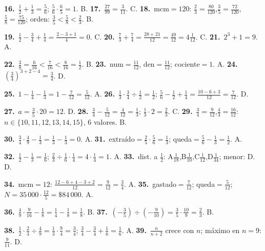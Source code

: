 \documentclass[11pt, letterpaper]{article}
\begin{document}
\textbf{16.}~$\tfrac{1}{2}+\tfrac{1}{3}=\tfrac{5}{6}$; $\tfrac{5}{6}\cdot\tfrac{6}{5}=1$. B. \quad
\textbf{17.}~$\tfrac{27}{99}=\tfrac{3}{11}$. C. \quad
\textbf{18.}~mcm$=120$: $\tfrac{2}{3}=\tfrac{80}{120}$,$\tfrac{3}{5}=\tfrac{72}{120}$,$\tfrac{5}{8}=\tfrac{75}{120}$; orden: $\tfrac{3}{5}<\tfrac{5}{8}<\tfrac{2}{3}$. B.

\textbf{19.}~$\tfrac{1}{2}-\tfrac{3}{4}+\tfrac{1}{4}=\tfrac{2-3+1}{4}=0$. C. \quad
\textbf{20.}~$\tfrac{7}{3}+\tfrac{7}{4}=\tfrac{28+21}{12}=\tfrac{49}{12}=4\tfrac{1}{12}$. C. \quad
\textbf{21.}~$2^3+1=9$. A.

\textbf{22.}~$\tfrac{3}{8}=\tfrac{6}{16}<\tfrac{7}{16}<\tfrac{8}{16}=\tfrac{1}{2}$. B. \quad
\textbf{23.}~num$=\tfrac{11}{12}$, den$=\tfrac{11}{12}$; cociente$=1$. A. \quad
\textbf{24.}~$\left(\tfrac{3}{4}\right)^{3+2-4}=\tfrac{3}{4}$. D.

\textbf{25.}~$1-\tfrac{1}{4}-\tfrac{1}{3}=1-\tfrac{7}{12}=\tfrac{5}{12}$. A. \quad
\textbf{26.}~$\tfrac{1}{3}\cdot\tfrac{3}{4}\div\tfrac{1}{2}=\tfrac{1}{2}$; $\tfrac{5}{6}-\tfrac{1}{2}+\tfrac{1}{4}=\tfrac{10-6+3}{12}=\tfrac{7}{12}$. D.

\textbf{27.}~$a=\tfrac{3}{5}\cdot20=12$. D. \quad
\textbf{28.}~$\tfrac{3}{4}-\tfrac{5}{12}=\tfrac{4}{12}=\tfrac{1}{3}$; $\tfrac{1}{3}\cdot2=\tfrac{2}{3}$. C. \quad
\textbf{29.}~$\tfrac{3}{4}=\tfrac{9}{12}$,$\tfrac{4}{3}=\tfrac{16}{12}$: $n\in\{10,11,12,13,14,15\}$, 6 valores. B.

\textbf{30.}~$\tfrac{3}{4}\cdot\tfrac{4}{9}-\tfrac{1}{3}=\tfrac{1}{3}-\tfrac{1}{3}=0$. A. \quad
\textbf{31.}~extra\'ido$=\tfrac{2}{5}\cdot\tfrac{5}{6}=\tfrac{1}{3}$; queda$=\tfrac{5}{6}-\tfrac{1}{3}=\tfrac{1}{2}$. A.

\textbf{32.}~$\tfrac{1}{2}-\tfrac{1}{3}=\tfrac{1}{6}$; $\tfrac{2}{3}\div\tfrac{1}{6}\cdot\tfrac{1}{4}=4\cdot\tfrac{1}{4}=1$. A. \quad
\textbf{33.}~dist. a $\tfrac{1}{2}$: A$\tfrac{1}{18}$,B$\tfrac{1}{10}$,C$\tfrac{1}{12}$,D$\tfrac{1}{34}$; menor: D. D.

\textbf{34.}~mcm$=12$: $\tfrac{12-6+4-3+2}{12}=\tfrac{9}{12}=\tfrac{3}{4}$. A. \quad
\textbf{35.}~gastado$=\tfrac{7}{12}$; queda$=\tfrac{5}{12}$; $N=35\,000\cdot\tfrac{12}{5}=\$84\,000$. A.

\textbf{36.}~$\tfrac{4}{9}\cdot\tfrac{9}{16}-\tfrac{1}{8}=\tfrac{1}{4}-\tfrac{1}{8}=\tfrac{1}{8}$. B. \quad
\textbf{37.}~$(-\tfrac{3}{5})\div(-\tfrac{9}{10})=\tfrac{3}{5}\cdot\tfrac{10}{9}=\tfrac{2}{3}$. B.

\textbf{38.}~$\tfrac{1}{2}\cdot\tfrac{2}{3}\div\tfrac{4}{9}=\tfrac{1}{3}\cdot\tfrac{9}{4}=\tfrac{3}{4}$; $\tfrac{3}{4}-\tfrac{3}{4}+\tfrac{1}{6}=\tfrac{1}{6}$. A. \quad
\textbf{39.}~$\tfrac{n}{n+2}$ crece con $n$; m\'aximo en $n=9$: $\tfrac{9}{11}$. D.
\end{document}
